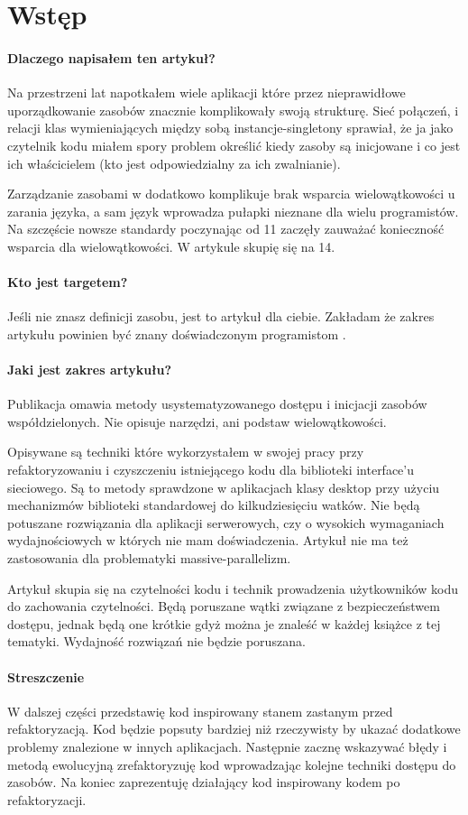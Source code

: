 \section{Wstęp}
\paragraph{Dlaczego napisałem ten artykuł?}
Na przestrzeni lat napotkałem wiele aplikacji które przez nieprawidłowe uporządkowanie zasobów znacznie komplikowały swoją strukturę. Sieć połączeń, i relacji klas wymieniających między sobą instancje-singletony sprawiał, że ja jako czytelnik kodu miałem spory problem określić kiedy zasoby są inicjowane i co jest ich właścicielem (kto jest odpowiedzialny za ich zwalnianie).

Zarządzanie zasobami w \Cpp{} dodatkowo komplikuje brak wsparcia wielowątkowości u zarania języka, a sam język wprowadza pułapki nieznane dla wielu programistów. Na szczęście nowsze standardy poczynając od \Cpp{}11 zaczęły zauważać konieczność wsparcia dla wielowątkowości. W artykule skupię się na \Cpp{}14.

\paragraph{Kto jest targetem?}
Jeśli nie znasz definicji zasobu, jest to artykuł dla ciebie. Zakładam że zakres artykułu powinien być znany doświadczonym programistom \Cpp.

\paragraph{Jaki jest zakres artykułu?}
Publikacja omawia metody usystematyzowanego dostępu i inicjacji zasobów współdzielonych. Nie opisuje narzędzi, ani podstaw wielowątkowości.

Opisywane są techniki które wykorzystałem w swojej pracy przy refaktoryzowaniu i czyszczeniu istniejącego kodu dla biblioteki interface'u sieciowego. Są to metody sprawdzone w aplikacjach klasy desktop przy użyciu mechanizmów biblioteki standardowej do kilkudziesięciu watków. Nie będą potuszane rozwiązania dla aplikacji serwerowych, czy o wysokich wymaganiach wydajnościowych w których nie mam doświadczenia. Artykuł nie ma też zastosowania dla problematyki massive-parallelizm.

Artykuł skupia się na czytelności kodu i technik prowadzenia użytkowników kodu do zachowania czytelności. Będą poruszane wątki związane z bezpieczeństwem dostępu, jednak będą one krótkie gdyż można je znaleść w każdej książce z tej tematyki. Wydajność rozwiązań nie będzie poruszana.

\paragraph{Streszczenie}
W dalszej części przedstawię kod inspirowany stanem zastanym przed refaktoryzacją. Kod będzie popsuty bardziej niż rzeczywisty by ukazać dodatkowe problemy znalezione w innych aplikacjach. Następnie zacznę wskazywać błędy i metodą ewolucyjną zrefaktoryzuję kod wprowadzając kolejne techniki dostępu do zasobów. Na koniec zaprezentuję działający kod inspirowany kodem po refaktoryzacji.
